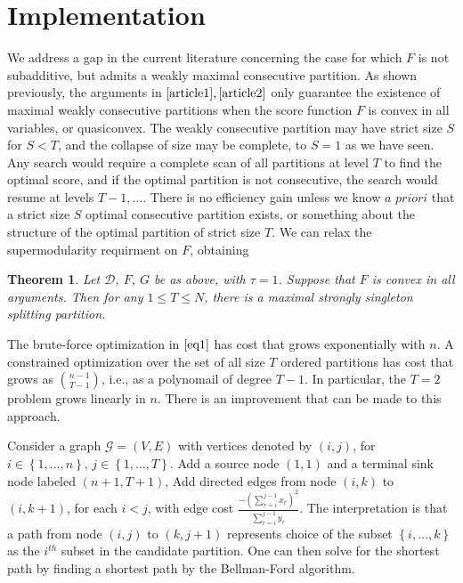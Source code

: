 \documentclass{article}
\newtheorem{thm}{Theorem}
\theoremstyle{case}
\begin{document}
\section{Implementation}
We address a gap in the current literature concerning the case for which $F$ is not subadditive, but admits a weakly maximal consecutive partition. As shown previously, the arguments in $\cite{article1}, \cite{article2}$ only guarantee the existence of maximal weakly consecutive partitions when the score function $F$ is convex in all variables, or quasiconvex. The weakly consecutive partition may have strict size $S$ for $S < T$, and the collapse of size may be complete, to $S = 1$ as we have seen. Any search would require a complete scan of all partitions at level $T$ to find the optimal score, and if the optimal partition is not consecutive, the search would resume at levels $T-1, ...$. There is no efficiency gain unless we know $\textit{a priori}$ that a strict size $S$ optimal consecutive partition exists, or something about the structure of the optimal partition of strict size $T$. We can relax the supermodularity requirment on $F$, obtaining

\begin{thm} \label{thm3}
Let $\mathcal{D}$, $F$, $G$ be as above, with $\tau = 1$. Suppose that $F$ is convex in all arguments. Then for any $1 \leq T \leq N$, there is a maximal strongly singleton splitting partition.
\end{thm}


The brute-force optimization in $\ref{eq1}$ has cost that grows exponentially with $n$. A constrained optimization over the set of all size $T$ ordered partitions has cost that grows as $\binom{n-1}{T-1}$, i.e., as a polynomail of degree $T-1$. In particular, the $T = 2$ problem grows linearly in $n$. There is an improvement that can be made to this approach.

Consider a graph $\mathcal{G} = \left( V, E\right)$ with vertices denoted by $\left( i, j\right)$, for $i \in \left\lbrace 1, \dots, n\right\rbrace$, $j \in \left\lbrace 1, \dots, T\right\rbrace$. Add a source node $\left( 1, 1\right)$ and a terminal sink node labeled $\left( n+1, T+1\right)$, Add directed edges from node $\left( i,k \right)$ to $\left( i, k+1\right)$, for each $i < j$, with edge cost $\frac{-\left(\sum_{r=i}^{j-1} x_r\right)^2}{\sum_{r=i}^{j-1} y_r}$. The interpretation is that a path from node $\left( i, j\right)$ to $\left( k, j+1\right)$ represents choice of the subset $\left\lbrace i, \dots, k\right\rbrace$ as the $i^{th}$ subset in the candidate partition. One can then solve for the shortest path by finding a shortest path by the Bellman-Ford algorithm. 
\end{document}
